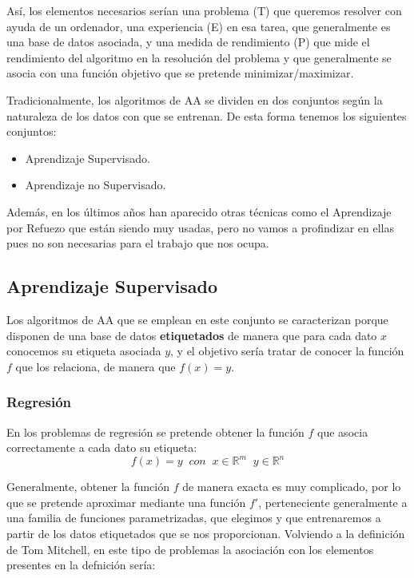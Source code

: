     \noindent Así, los elementos necesarios serían una problema (T) que queremos resolver con ayuda de un ordenador, una experiencia (E) en esa tarea, que generalmente es una base de datos asociada, y una medida de rendimiento (P) que mide el rendimiento del algoritmo en la resolución del problema y que generalmente se asocia con una función objetivo que se pretende minimizar/maximizar.

    \medskip

    \noindent Tradicionalmente, los algoritmos de AA se dividen en dos conjuntos según la naturaleza de los datos con que se entrenan. De esta forma tenemos los siguientes conjuntos:

    \begin{itemize}
        \item Aprendizaje Supervisado.
        \item Aprendizaje no Supervisado.
    \end{itemize}

    \medskip 
    
    \noindent Además, en los últimos años han aparecido otras técnicas como el Aprendizaje por Refuezo que están siendo muy usadas, pero no vamos a profindizar en ellas pues no son necesarias para el trabajo que nos ocupa.

    \subsection{Aprendizaje Supervisado}
        \noindent Los algoritmos de AA que se emplean en este conjunto se caracterizan porque disponen de una base de datos \textbf{etiquetados} de manera que para cada dato $x$ conocemos su etiqueta asociada $y$, y el objetivo sería tratar de conocer la función $f$ que los relaciona, de manera que $f(x)=y$.

        \subsubsection{Regresión} \label{section::Regresion}
            \noindent En los problemas de regresión se pretende obtener la función $f$ que asocia correctamente a cada dato su etiqueta: 
            \begin{equation}
                f(x)=y \; \; con \; \; x\in \mathbb{R}^m \; \; y \in \mathbb{R}^n
            \end{equation}
            
            \noindent Generalmente, obtener la función $f$ de manera exacta es muy complicado, por lo que se pretende aproximar mediante una función $f'$, perteneciente generalmente a una familia de funciones parametrizadas, que elegimos y que entrenaremos a partir de los datos etiquetados que se nos proporcionan. Volviendo a la definición de Tom Mitchell, en este tipo de problemas la asociación con los elementos presentes en la defnición sería:
            
